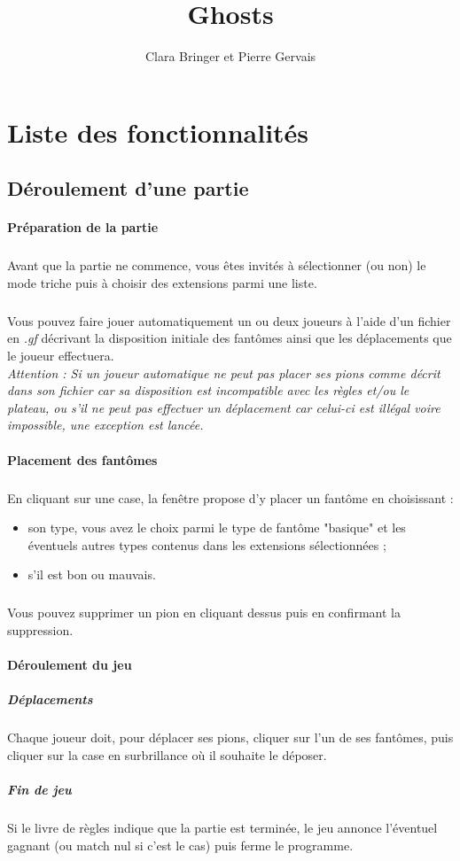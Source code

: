 \documentclass[]{report}
\title{Ghosts}
\author{Clara Bringer et Pierre Gervais}
\begin{document}
\maketitle

\section{Liste des fonctionnalités}
\subsection{Déroulement d'une partie}
\paragraph{Préparation de la partie}
\subparagraph*{}
Avant que la partie ne commence, vous êtes invités à sélectionner (ou non) le mode triche puis à choisir des extensions parmi une liste.
\subparagraph*{}
Vous pouvez faire jouer automatiquement un ou deux joueurs à l'aide d'un fichier en \textit{.gf} décrivant la disposition initiale des fantômes ainsi que les déplacements que le joueur effectuera.\\
\emph{Attention : Si un joueur automatique ne peut pas placer ses pions comme décrit dans son fichier car sa disposition est incompatible avec les règles et/ou le plateau, ou s'il ne peut pas effectuer un déplacement car celui-ci est illégal voire impossible, une exception est lancée.}

\paragraph{Placement des fantômes}
\subparagraph*{}
En cliquant sur une case, la fenêtre propose d'y placer un fantôme en choisissant :
\begin{itemize}
	\item son type, vous avez le choix parmi le type de fantôme "basique" et les éventuels autres types contenus dans les extensions sélectionnées ;
	\item s'il est bon ou mauvais.
\end{itemize}
\subparagraph*{}
Vous pouvez supprimer un pion en cliquant dessus puis en confirmant la suppression.

\paragraph{Déroulement du jeu}
\subparagraph{Déplacements}
Chaque joueur doit, pour déplacer ses pions, cliquer sur l'un de ses fantômes, puis cliquer sur la case en surbrillance où il souhaite le déposer.
\subparagraph{Fin de jeu}
Si le livre de règles indique que la partie est terminée, le jeu annonce l'éventuel gagnant (ou match nul si c'est le cas) puis ferme le programme.
\end{document}
